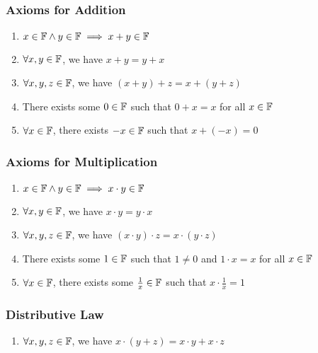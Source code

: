 \documentclass[class=article, crop=false]{standalone}
\begin{document}
  \subsubsection{Axioms for Addition}
  \begin{enumerate}[label=(A\arabic*)]
    \item $x\in \mathbb{F}\land y\in \mathbb{F}\implies x + y\in\mathbb{F}$
    \item $\forall x,y\in\mathbb{F}$, we have $x + y = y + x$
    \item $\forall x,y,z\in \mathbb{F}$, we have $(x + y) + z = x + (y + z)$
    \item There exists some $0\in\mathbb{F}$ such that $0 + x = x$ for all $x\in\mathbb{F}$
    \item $\forall x\in\mathbb{F}$, there exists $-x\in\mathbb{F}$ such that $x + (-x) = 0$
  \end{enumerate}
  \subsubsection{Axioms for Multiplication}
  \begin{enumerate}[label=(M\arabic*)]
    \item $x\in\mathbb{F}\land y\in\mathbb{F}\implies x\cdot y\in\mathbb{F}$
    \item $\forall x,y\in\mathbb{F}$, we have $x\cdot y = y\cdot x$
    \item $\forall x, y, z\in\mathbb{F}$, we have $(x\cdot y)\cdot z = x\cdot (y\cdot z)$
    \item There exists some $1\in\mathbb{F}$ such that $1\neq 0$ and $1\cdot x = x$ for all $x\in\mathbb{F}$
    \item $\forall x\in\mathbb{F}$, there exists some $\frac{1}{x}\in\mathbb{F}$ such that $x\cdot \frac{1}{x} = 1$
  \end{enumerate}
  \subsubsection{Distributive Law}
  \begin{enumerate}[label=(D\arabic*)]
    \item $\forall x, y, z\in\mathbb{F}$, we have $x\cdot (y + z) = x\cdot y + x\cdot z$
  \end{enumerate}
\end{document}
